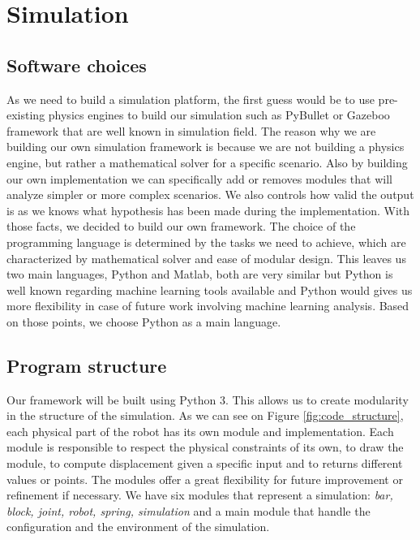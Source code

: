 \chapter{Simulation}

    \section{Software choices}
        As we need to build a simulation platform, the first guess would be to use pre-existing physics engines to build our simulation such as PyBullet or Gazeboo framework that are well known in simulation field. The reason why we are building our own simulation framework is because we are not building a physics engine, but rather a mathematical solver for a specific scenario. Also by building our own implementation we can specifically add or removes modules that will analyze simpler or more complex scenarios. We also controls how valid the output is as we knows what hypothesis has been made during the implementation. With those facts, we decided to build our own framework. The choice of the programming language is determined by the tasks we need to achieve, which are characterized by mathematical solver and ease of modular design. This leaves us two main languages, Python and Matlab, both are very similar but Python is well known regarding machine learning tools available and Python would gives us more flexibility in case of future work involving machine learning analysis. Based on those points, we choose Python as a main language. 
    
    \section{Program structure}\label{sec:program_structure}
        Our framework will be built using Python 3. This allows us to create modularity in the structure of the simulation. As we can see on Figure \ref{fig:code_structure}, each physical part of the robot has its own module and implementation. Each module is responsible to respect the physical constraints of its own, to draw the module, to compute displacement given a specific input and to returns different values or points. The modules offer a great flexibility for future improvement or refinement if necessary. We have six modules that represent a simulation: \textit{bar, block, joint, robot, spring, simulation} and a main module that handle the configuration and the environment of the simulation. \\
        
